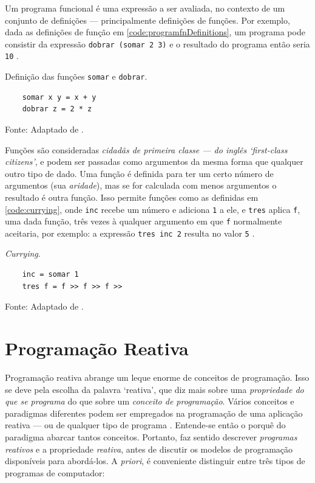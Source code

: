 Um programa funcional é uma expressão a ser avaliada, no contexto de um
conjunto de definições — principalmente definições de funções.
Por exemplo, dada as definições de função em \ref{code:programfnDefinitions}, um
programa pode consistir da expressão \texttt{dobrar (somar 2 3)} e o resultado
do programa então seria \texttt{10} \cite{noble1994}.

\begin{listing}[H]
  \centering
  \caption{Definição das funções \texttt{somar} e \texttt{dobrar}.}
  \begin{verbatim}
    somar x y = x + y
    dobrar z = 2 * z
  \end{verbatim}
  \small Fonte: Adaptado de \textcite{noble1994}.
  \label{code:programfnDefinitions}
\end{listing}

Funções são consideradas \emph{cidadãs de primeira classe — do inglês ‘first-class
citizens’}, e podem ser passadas como argumentos da mesma forma que qualquer
outro tipo de dado.
Uma função é definida para ter um certo número de argumentos (sua \emph{aridade}),
mas se for calculada com menos argumentos o resultado é outra função.
Isso permite funções como as definidas em \ref{code:currying}, onde \texttt{inc} recebe
um número e adiciona \texttt{1} a ele, e \texttt{tres} aplica \texttt{f}, uma dada função, três
vezes à qualquer argumento em que \texttt{f} normalmente aceitaria, por exemplo: a
expressão \texttt{tres inc 2} resulta no valor \texttt{5} \cite{noble1994}.

\begin{listing}[H]
  \centering \caption{\emph{Currying}.}
  \begin{verbatim}
    inc = somar 1
    tres f = f >> f >> f >>
  \end{verbatim}
  \small Fonte: Adaptado de \textcite{noble1994}.
  \label{code:currying}
\end{listing}

\section{Programação Reativa}
\label{sec:orgdd0fbe1}
Programação reativa abrange um leque enorme de conceitos de programação.
Isso se deve pela escolha da palavra ‘reativa’, que diz mais sobre uma
\emph{propriedade do que se programa} do que sobre um \emph{conceito de programação}.
Vários conceitos e paradigmas diferentes podem ser empregados na programação
de uma aplicação reativa — ou de qualquer tipo de programa \cite{roy2009}.
Entende-se então o porquê do paradigma abarcar tantos conceitos.
Portanto, faz sentido descrever \emph{programas reativos} e a propriedade
\emph{reativa}, antes de discutir os modelos de programação disponíveis para
abordá-los.
A \emph{priori}, é conveniente distinguir entre três tipos de programas de
computador:

